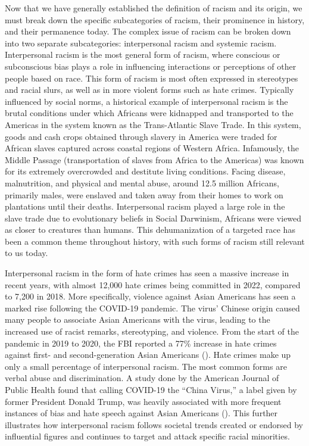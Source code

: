 \documentclass[12pt, a4paper, twoside]{article}
\begin{document}
Now that we have generally established the definition of racism and its origin, we must break down the specific subcategories of racism, their prominence in history, and their permanence today. The complex issue of racism can be broken down into two separate subcategories: interpersonal racism and systemic racism. Interpersonal racism is the most general form of racism, where conscious or subconscious bias plays a role in influencing interactions or perceptions of other people based on race. This form of racism is most often expressed in stereotypes and racial slurs, as well as in more violent forms such as hate crimes. Typically influenced by social norms, a historical example of interpersonal racism is the brutal conditions under which Africans were kidnapped and transported to the Americas in the system known as the Trans-Atlantic Slave Trade. In this system, goods and cash crops obtained through slavery in America were traded for African slaves captured across coastal regions of Western Africa. Infamously, the Middle Passage (transportation of slaves from Africa to the Americas) was known for its extremely overcrowded and destitute living conditions. Facing disease, malnutrition, and physical and mental abuse, around 12.5 million Africans, primarily males, were enslaved and taken away from their homes to work on plantations until their deaths. Interpersonal racism played a large role in the slave trade due to evolutionary beliefs in Social Darwinism, Africans were viewed as closer to creatures than humans. This dehumanization of a targeted race has been a common theme throughout history, with such forms of racism still relevant to us today. 

Interpersonal racism in the form of hate crimes has seen a massive increase in recent years, with almost 12,000 hate crimes being committed in 2022, compared to 7,200 in 2018. More specifically, violence against Asian Americans has seen a marked rise following the COVID-19 pandemic. The virus’ Chinese origin caused many people to associate Asian Americans with the virus, leading to the increased use of racist remarks, stereotyping, and violence. From the start of the pandemic in 2019 to 2020, the FBI reported a 77\% increase in hate crimes against first- and second-generation Asian Americans (\cite{findling2022}). Hate crimes make up only a small percentage of interpersonal racism. The most common forms are verbal abuse and discrimination. A study done by the American Journal of Public Health found that calling COVID-19 the “China Virus,” a label given by former President Donald Trump, was heavily associated with more frequent instances of bias and hate speech against Asian Americans (\cite{hswen2021}). This further illustrates how interpersonal racism follows societal trends created or endorsed by influential figures and continues to target and attack specific racial minorities. 
\end{document}
